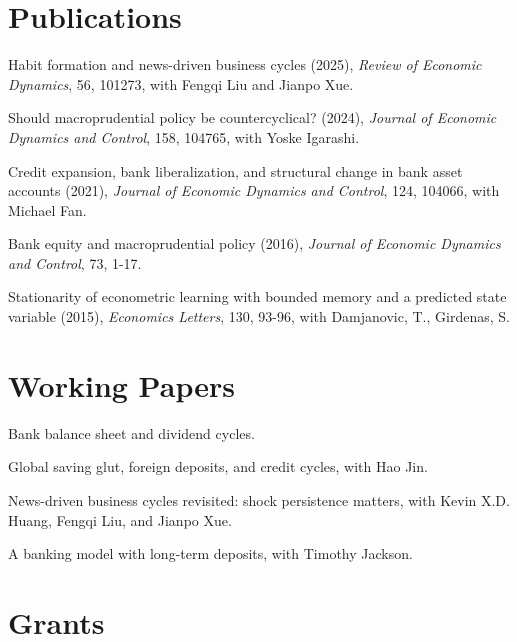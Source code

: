 \documentclass[11pt]{article}
\begin{document}
\section*{Publications}

\begin{enumerate}[label={[\arabic*]}]
\item{Habit formation and news-driven business cycles (2025), \textit{Review of Economic Dynamics}, 56, 101273,  with Fengqi Liu and Jianpo Xue.}
\item{Should macroprudential policy be countercyclical? (2024), \textit{Journal of Economic Dynamics and Control}, 158, 104765,  with Yoske Igarashi.}
\item {Credit expansion, bank liberalization, and structural change in bank asset accounts (2021), \textit{Journal of Economic Dynamics and Control}, 124, 104066, with Michael Fan.} 
\item{ Bank equity and macroprudential policy (2016), \textit{Journal of Economic Dynamics and Control}, 73, 1-17.} 
\item{ Stationarity of econometric learning with bounded memory and a predicted state variable  (2015), \textit{Economics Letters}, 130, 93-96, with Damjanovic, T., Girdenas, S. }
\end{enumerate}


\section*{Working Papers}
\begin{enumerate}[label={[\arabic*]}]

\item{Bank balance sheet and dividend cycles. }

\item{Global saving glut, foreign deposits, and credit cycles, with Hao Jin.}

\item{News-driven business cycles revisited: shock persistence matters, with Kevin X.D. Huang, Fengqi Liu, and Jianpo Xue.}

\item{A banking model with long-term deposits, with Timothy Jackson.}

\end{enumerate}

\section*{Grants}
\end{document}
